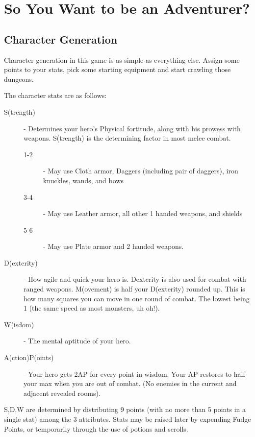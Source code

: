 \documentclass[a6paper,hidelinks]{article}
\begin{document}
\section{So You Want to be an Adventurer?}

\subsection{Character Generation}
Character generation in this game is as simple as everything else. Assign some points to your stats, pick some starting equipment and start crawling those dungeons.

The character stats are as follows:
\begin{description}

\item[S(trength)] - Determines your hero's Physical fortitude, along with his prowess with weapons. S(trength) is the determining factor in most melee combat.
  \begin{description}
  \item[1-2] - May use Cloth armor, Daggers (including pair of daggers), iron knuckles, wands, and bows
  \item[3-4] - May use Leather armor, all other 1 handed weapons, and shields
  \item[5-6] - May use Plate armor and 2 handed weapons.
\end{description}

\item[D(exterity)] - How agile and quick your hero is. Dexterity is also used for combat with ranged weapons.
M(ovement) is half your D(exterity) rounded up. This is how many squares you can move in one round of combat. The lowest being 1 (the same speed as most monsters, uh oh!).

\item[W(isdom)] - The mental aptitude of your hero.

\item[A(ction)P(oints)] - Your hero gets 2AP for every point in wisdom. Your AP restores to half your max when you are out of combat. (No enemies in the current and adjacent revealed rooms).

\end{description}

S,D,W are determined by distributing 9 points (with no more than 5 points in a single stat) among the 3 attributes. Stats may be raised later by expending  Fudge Points, or temporarily through the use of potions and scrolls.
\end{document}
